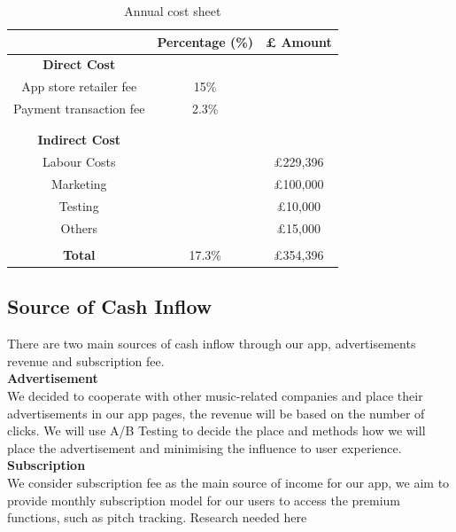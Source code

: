 \begin{table}[ht]
\centering
\begin{tabular}{ |c|c|c|} 
 \hline
 &\textbf{Percentage (\%)} &\textbf{ £ Amount }\\
 \hline
\multicolumn{1}{|c}{\textbf{Direct Cost}} &\multicolumn{1}{c}{}&\\
 \hline
 App store retailer fee&15\%&\\
 \hline
 Payment transaction fee&2.3\%&\\
 \hline
 &&\\
 \hline
 \multicolumn{1}{|c}{}&\multicolumn{1}{c}{}&\\\hline
 \multicolumn{1}{|c}{\textbf{Indirect Cost}} &\multicolumn{1}{c}{}&\\
 \hline
 Labour Costs&&£229,396\\
 \hline
 Marketing&&£100,000\\
 \hline
 Testing&&£10,000\\
 \hline
 Others&&£15,000\\
 \hline
 \multicolumn{1}{|c}{}&\multicolumn{1}{c}{}&\\
 \hline
 \textbf{Total}&17.3\%&£354,396\\
 \hline
 \end{tabular}
 \caption{Annual cost sheet}
 \end{table}


\subsection{Source of Cash Inflow}
There are two main sources of cash inflow through our app, advertisements revenue and subscription fee.
\\ \textbf{Advertisement}
\\ We decided to cooperate with other music-related companies and place their advertisements in our app pages, the revenue will be based on the number of clicks. We will use A/B Testing to decide the place and methods how we will place the advertisement and minimising the influence to user experience.
\\ \textbf{Subscription}
\\We consider subscription fee as the main source of income for our app, we aim to provide monthly subscription model for our users to access the premium functions, such as pitch tracking. Research needed here

